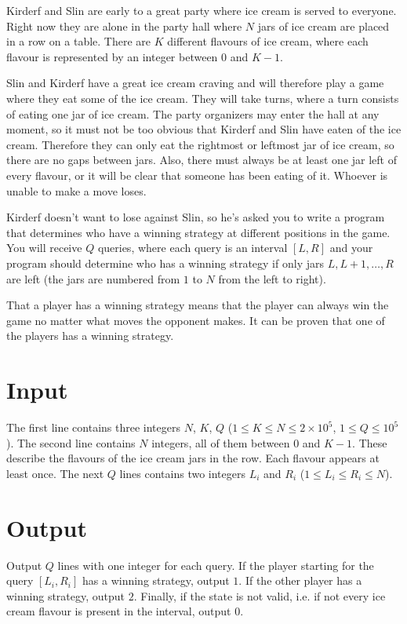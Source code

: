 Kirderf and Slin are early to a great party where ice cream is served to everyone.
Right now they are alone in the party hall where $N$ jars of ice cream are placed in a row on a table.
There are $K$ different flavours of ice cream, where each flavour is represented by an integer between $0$ and $K - 1$.

Slin and Kirderf have a great ice cream craving and will therefore play a game where they eat some of the ice cream.
They will take turns, where a turn consists of eating one jar of ice cream.
The party organizers may enter the hall at any moment, so it must not be too obvious that Kirderf and Slin have eaten of the ice cream.
Therefore they can only eat the rightmost or leftmost jar of ice cream, so there are no gaps between jars.
Also, there must always be at least one jar left of every flavour, or it will be clear that someone has been eating of it.
Whoever is unable to make a move loses.

Kirderf doesn't want to lose against Slin, so he's asked you to write a program that determines who have a winning strategy at different positions in the game.
You will receive $Q$ queries, where each query is an interval $[L, R]$ and your program should determine who has a winning strategy if only jars $L, L + 1, \dots, R$ are left (the jars are numbered from $1$ to $N$ from the left to right).

That a player has a winning strategy means that the player can always win the game no matter what moves the opponent makes.
It can be proven that one of the players has a winning strategy.

\section*{Input}
The first line contains three integers $N$, $K$, $Q$ ($1 \le K \le N \le 2 \times 10^5$, $1 \le Q \le 10^5$).
The second line contains $N$ integers, all of them between $0$ and $K - 1$.
These describe the flavours of the ice cream jars in the row.
Each flavour appears at least once.
The next $Q$ lines contains two integers $L_i$ and $R_i$ ($1 \le L_i \le R_i \le N$).

\section*{Output}
Output $Q$ lines with one integer for each query.
If the player starting for the query $[L_i, R_i]$ has a winning strategy, output $1$.
If the other player has a winning strategy, output $2$.
Finally, if the state is not valid, i.e. if not every ice cream flavour is present in the interval, output $0$.

